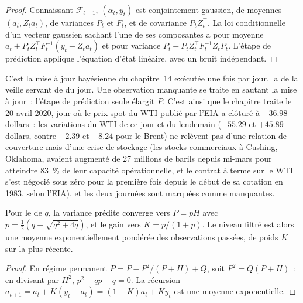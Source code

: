\begin{proof}
Connaissant $\mathcal F_{t-1}$, $(\alpha_t, y_t)$ est conjointement gaussien, de moyennes $(a_t, Z_ta_t)$, de variances $P_t$ et $F_t$, et de covariance $P_tZ_t^\top$. La
loi conditionnelle d'un vecteur gaussien sachant l'une de ses composantes a pour moyenne $a_t + P_tZ_t^\top F_t^{-1}(y_t - Z_ta_t)$ et pour variance $P_t - P_tZ_t^\top
F_t^{-1}Z_tP_t$. L'étape de prédiction applique l'équation d'état linéaire, avec un bruit indépendant.
\end{proof}

C'est la mise à jour bayésienne du chapitre~14 exécutée une fois par jour, la  de la veille servant de  du jour. Une observation manquante se traite en sautant la
mise à jour~: l'étape de prédiction seule élargit $P$. C'est ainsi que le chapitre traite le 20 avril 2020, jour où le prix spot du WTI publié par l'EIA a clôturé à $-36.98$ dollars~:
les variations du WTI de ce jour et du lendemain ($-55.29$ et $+45.89$ dollars, contre $-2.39$ et $-8.24$ pour le Brent) ne relèvent pas d'une relation de couverture mais d'une crise de stockage
(les stocks commerciaux à Cushing, Oklahoma, avaient augmenté de 27 millions de barils depuis mi-mars pour atteindre 83~\% de leur capacité opérationnelle, et le
contrat à terme sur le WTI s'est négocié sous zéro pour la première fois depuis le début de sa cotation en 1983, selon l'EIA), et les deux journées sont marquées comme manquantes.

\begin{proposition}\label{prop:qm:state-space-models-and-the-kalman-filter:gain}
Pour le  de  $q$, la variance prédite converge vers $P = pH$ avec $p = \frac12(q + \sqrt{q^2 + 4q})$, et le gain vers
$K = p/(1 + p)$. Le niveau filtré est alors une moyenne exponentiellement pondérée des observations passées, de poids $K$ sur la plus récente.
\end{proposition}

\begin{proof}
En régime permanent $P = P - P^2/(P + H) + Q$, soit $P^2 = Q(P + H)$~; en divisant par $H^2$, $p^2 - qp - q = 0$. La récursion $a_{t+1} = a_t + K(y_t - a_t) =
(1 - K)a_t + Ky_t$ est une moyenne exponentielle.
\end{proof}

